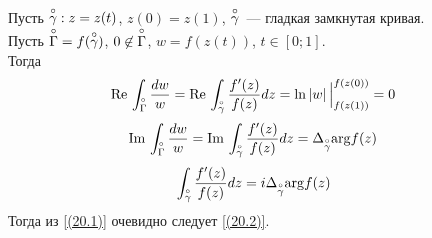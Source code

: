 \pr
Пусть $\overset{\circ}{\gamma}: z = z(t)$, $z(0) = z(1)$, $\overset{\circ}{\gamma}$~--- гладкая замкнутая кривая.
\\
Пусть $\overset{\circ}{\Gamma} = f(\overset{\circ}{\gamma})$, $0 \not \in \overset{\circ}{\Gamma}$, $w =
f(z(t))$, $t \in [0;1]$.
\\
Тогда
\begin{align*}
  & \mathrm{Re}\, \int_{\overset{\circ}{\Gamma}}\frac{dw}{w} = \mathrm{Re}\, \int_{\overset{\circ}{\gamma}}\frac{f'(z)}{f(z)}dz = \ln\left| w \right| \Big|_{f(z(1))}^{f(z(0))} = 0
\end{align*}
\begin{align*}
  & \mathrm{Im}\, \int_{\overset{\circ}{\Gamma}}\frac{dw}{w} = \mathrm{Im}\, \int_{\overset{\circ}{\gamma}}\frac{f'(z)}{f(z)}dz = \Delta_{\overset{\circ}{\gamma}}\mathrm{arg} f(z)
\end{align*}
\begin{align*}
  & \int_{\overset{\circ}{\gamma}}\frac{f'(z)}{f(z)}dz = i\Delta_{\overset{\circ}{\gamma}}\mathrm{arg} f(z)
\end{align*}
Тогда из \eqref{(20.1)} очевидно следует \eqref{(20.2)}.